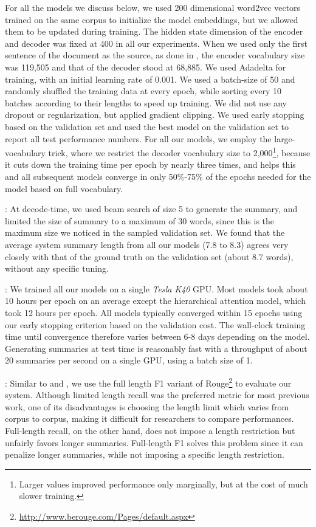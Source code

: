 \documentclass[11pt]{article}
\begin{document}
 For all the models we discuss below, we used 200 dimensional word2vec vectors \cite{word2vec} trained on the same corpus to initialize the model embeddings, but we allowed them to be updated during training. 
The hidden state dimension of the encoder and decoder was fixed at 400 in all our experiments. 
When we used only the first sentence of the document as the source, as done in , the encoder vocabulary size was 119,505 and that of the decoder stood at 68,885. We used Adadelta \cite{adadelta} for training, with an initial learning rate of 0.001. We used a batch-size of 50 and randomly shuffled the training data at every epoch, while sorting every 10 batches according to their lengths to speed up training. We did not use any dropout or regularization, but applied gradient clipping. We used early stopping based on the validation set and used the best model on the validation set to report all test performance numbers. For all our models, we employ the large-vocabulary trick, where we restrict the decoder vocabulary size to 2,000\footnote{Larger values improved performance only marginally, but at the cost of much slower training.}, because it cuts down the training time per epoch by nearly three times, and helps this and all subsequent models converge in only 50\%-75\% of the epochs needed for the model based on full vocabulary.

: At decode-time, we used beam search of size 5 to generate the summary, and limited the size of summary to a maximum of 30 words, since this is the maximum size we noticed in the sampled validation set. We found that the average system summary length from all our models (7.8 to 8.3) agrees very closely with that of the ground truth on the validation set (about 8.7 words), without any specific tuning. 

: We trained all our models on a single {\it Tesla K40} GPU. Most models took about 10 hours per epoch on an average except the hierarchical attention model, which took 12 hours per epoch. All models typically converged within 15 epochs using our early stopping criterion based on the validation cost. The wall-clock training time until convergence therefore varies between 6-8 days depending on the model. Generating summaries at test time is reasonably fast with a throughput of about 20 summaries per second on a single GPU, using a batch size of 1. 


: Similar to \cite{nallapati} and \cite{chopra}, we use the full length F1 variant of Rouge\footnote{\url{http://www.berouge.com/Pages/default.aspx}} to evaluate our system.
Although limited length recall was the preferred metric for most previous work, one of its disadvantages is choosing the length limit which varies from corpus to corpus, making it difficult for researchers to compare performances. Full-length recall, on the other hand, does not impose a length restriction but unfairly favors longer summaries. Full-length F1 solves this problem since it can penalize longer summaries, while not imposing a specific length restriction. 
\end{document}
